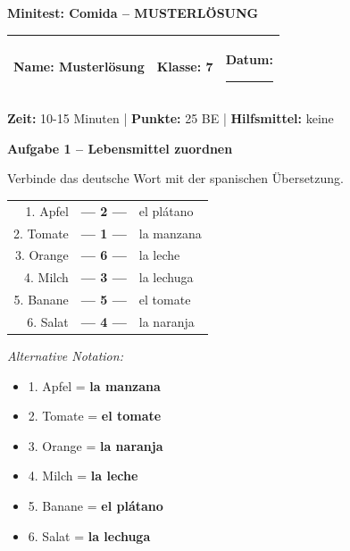 \documentclass[11pt, a4paper]{article}
\newcommand{\fachfarbe}{spanisch}
\newcommand{\thema}{Minitest: Comida -- MUSTERLÖSUNG}
\newcommand{\klasse}{7}
\newcommand{\maxpunkte}{25}
\newcommand{\zeit}{10-15 Minuten}
\newcommand{\punktebox}[1]{\hfill\fbox{\small \_/#1}}
\newcommand{\luecke}[1]{\rule{#1}{0.4pt}}
\newcommand{\lsg}[1]{\textcolor{loesung}{\textbf{#1}}}
\newenvironment{aufgabe}[1]{%
    \needspace{5\baselineskip}%
    \nopagebreak[4]%
    \vspace{10pt}
    \noindent\textbf{\textcolor{\fachfarbe}{Aufgabe #1}}
    \nopagebreak[4]%
    \vspace{5pt}
    \nopagebreak[4]%
    \begin{list}{}{\leftmargin=0pt}
    \item[]
}{%
    \end{list}
}
\begin{document}

\begin{center}
    {\Large\bfseries\textcolor{loesung}{\thema}}
\end{center}

\vspace{5pt}

\noindent
\begin{tabularx}{\textwidth}{|X|X|X|}
\hline
\textbf{Name:} \lsg{Musterlösung} &
\textbf{Klasse:} \klasse &
\textbf{Datum:} \luecke{2cm} \\
\hline
\end{tabularx}

\vspace{10pt}

\begin{infobox}
\textbf{Zeit:} \zeit{} | \textbf{Punkte:} \maxpunkte{} BE | \textbf{Hilfsmittel:} keine
\end{infobox}

\vspace{15pt}


\begin{aufgabe}{1 -- Lebensmittel zuordnen}
Verbinde das deutsche Wort mit der spanischen Übersetzung. \punktebox{6}
\end{aufgabe}

\begin{center}
\begin{tabular}{rcl}
1. Apfel & \lsg{--- 2 ---} & el plátano \\[0.8em]
2. Tomate & \lsg{--- 1 ---} & la manzana \\[0.8em]
3. Orange & \lsg{--- 6 ---} & la leche \\[0.8em]
4. Milch & \lsg{--- 3 ---} & la lechuga \\[0.8em]
5. Banane & \lsg{--- 5 ---} & el tomate \\[0.8em]
6. Salat & \lsg{--- 4 ---} & la naranja \\
\end{tabular}
\end{center}

\textit{Alternative Notation:}
\begin{itemize}[nosep]
    \item 1. Apfel = \lsg{la manzana}
    \item 2. Tomate = \lsg{el tomate}
    \item 3. Orange = \lsg{la naranja}
    \item 4. Milch = \lsg{la leche}
    \item 5. Banane = \lsg{el plátano}
    \item 6. Salat = \lsg{la lechuga}
\end{itemize}
\end{document}
